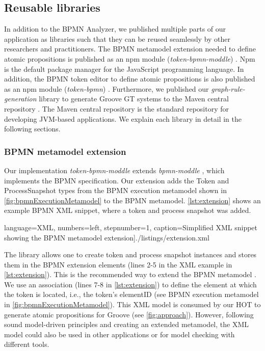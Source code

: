 \documentclass{lmcs} %
\begin{document}
\subsection{Reusable libraries}
In addition to the BPMN Analyzer, we published multiple parts of our application as libraries such that they can be reused seamlessly by other researchers and practitioners.
The BPMN metamodel extension needed to define atomic propositions is published as an npm module (\textit{token-bpmn-moddle}) \cite{timkrauterLMCS2024Artifacts2023}.
Npm is the default package manager for the JavaScript programming language.
In addition, the BPMN token editor to define atomic propositions is also published as an npm module (\textit{token-bpmn}) \cite{timkrauterLMCS2024Artifacts2023}.
Furthermore, we published our \textit{graph-rule-generation} library to generate Groove GT systems to the Maven central repository \cite{timkrauterLMCS2024Artifacts2023}.
The Maven central repository is the standard repository for developing JVM-based applications.
We explain each library in detail in the following sections.

\subsubsection{BPMN metamodel extension}
Our implementation \textit{token-bpmn-moddle} \cite{timkrauterLMCS2024Artifacts2023} extends \textit{bpmn-moddle} \cite{camundaservicesgmbhBpmnmoddle2023}, which implements the BPMN specification.
Our extension adds the \textsf{Token} and \textsf{ProcessSnapshot} types from the BPMN execution metamodel shown in \autoref{fig:bpmnExecutionMetamodel} to the BPMN metamodel.
\autoref{lst:extension} shows an example BPMN XML snippet, where a token and process snapshot was added.

 language=XML, numbers=left,
    stepnumber=1, caption=Simplified XML snippet showing the BPMN metamodel extension]{./listings/extension.xml}

The library allows one to create token and process snapshot instances and stores them in the BPMN extension elements (lines 2-5 in the XML example in \autoref{lst:extension}).
This is the recommended way to extend the BPMN metamodel \cite{objectmanagementgroupBusinessProcessModel2013}.
We use an association (lines 7-8 in \autoref{lst:extension}) to define the element at which the token is located, i.e., the token's \textsf{elementID} (see BPMN execution metamodel in \autoref{fig:bpmnExecutionMetamodel}).
This XML model is consumed by our HOT to generate atomic propositions for Groove (see \autoref{fig:approach}).
However, following sound model-driven principles and creating an extended metamodel, the XML model could also be used in other applications or for model checking with different tools.
\end{document}
